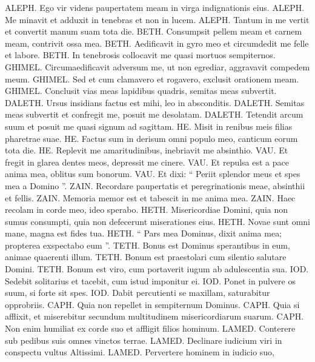 \begin{biblechapter}
\begin{biblechapter}
\begin{biblechapter}
 \verse ALEPH. Ego vir videns paupertatem meam
 in virga indignationis eius.
 \verse ALEPH. Me minavit et adduxit
 in tenebras et non in lucem.
 \verse ALEPH. Tantum in me vertit et convertit
 manum suam tota die.
 \verse BETH. Consumpsit pellem meam et carnem meam,
 contrivit ossa mea.
 \verse BETH. Aedificavit in gyro meo
 et circumdedit me felle et labore.
 \verse BETH. In tenebrosis collocavit me
 quasi mortuos sempiternos.
 \verse GHIMEL. Circumaedificavit adversum me, ut non egrediar,
 aggravavit compedem meum.
 \verse GHIMEL. Sed et cum clamavero et rogavero,
 exclusit orationem meam.
 \verse GHIMEL. Conclusit vias meas lapidibus quadris,
 semitas meas subvertit.
 \verse DALETH. Ursus insidians factus est mihi,
 leo in absconditis.
 \verse DALETH. Semitas meas subvertit et confregit me,
 posuit me desolatam.
 \verse DALETH. Tetendit arcum suum et posuit me
 quasi signum ad sagittam.
 \verse HE. Misit in renibus meis
 filias pharetrae suae.
 \verse HE. Factus sum in derisum omni populo meo,
 canticum eorum tota die.
 \verse HE. Replevit me amaritudinibus,
 inebriavit me absinthio.
 \verse VAU. Et fregit in glarea dentes meos,
 depressit me cinere.
 \verse VAU. Et repulsa est a pace anima mea,
 oblitus sum bonorum.
 \verse VAU. Et dixi: “ Periit splendor meus et spes mea a Domino ”.
 \verse ZAIN. Recordare paupertatis et peregrinationis meae,
 absinthii et fellis.
 \verse ZAIN. Memoria memor est
 et tabescit in me anima mea.
 \verse ZAIN. Haec recolam in corde meo,
 ideo sperabo.
 \verse HETH. Misericordiae Domini, quia non sumus consumpti,
 quia non defecerunt miserationes eius.
 \verse HETH. Novae sunt omni mane,
 magna est fides tua.
 \verse HETH. “ Pars mea Dominus, dixit anima mea;
 propterea exspectabo eum ”.
 \verse TETH. Bonus est Dominus sperantibus in eum,
 animae quaerenti illum.
 \verse TETH. Bonum est praestolari cum silentio
 salutare Domini.
 \verse TETH. Bonum est viro, cum portaverit
 iugum ab adulescentia sua.
 \verse IOD. Sedebit solitarius et tacebit,
 cum istud imponitur ei.
 \verse IOD. Ponet in pulvere os suum,
 si forte sit spes.
 \verse IOD. Dabit percutienti se maxillam,
 saturabitur opprobriis.
 \verse CAPH. Quia non repellet in sempiternum
 Dominus.
 \verse CAPH. Quia si afflixit, et miserebitur
 secundum multitudinem misericordiarum suarum.
 \verse CAPH. Non enim humiliat ex corde suo
 et affligit filios hominum.
 \verse LAMED. Conterere sub pedibus suis
 omnes vinctos terrae.
 \verse LAMED. Declinare iudicium viri
 in conspectu vultus Altissimi.
 \verse LAMED. Pervertere hominem in iudicio suo,

\end{biblechapter}
\end{biblechapter}
\end{biblechapter}
